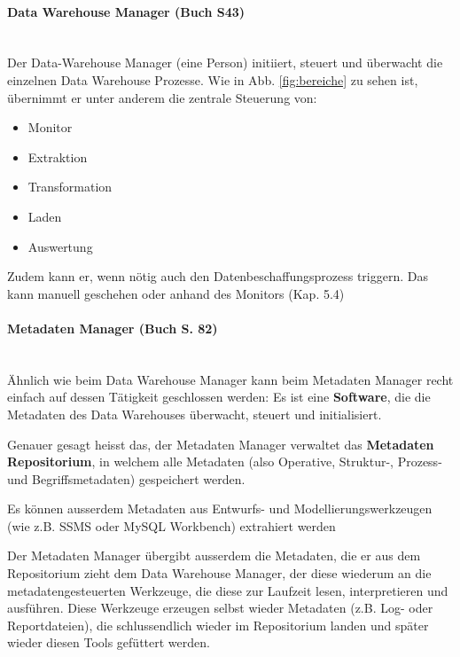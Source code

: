 \documentclass[a4paper, 11pt, nofootinbib]{article}
\begin{document}
\paragraph{Data Warehouse Manager (Buch S43)}\mbox{}\\
Der Data-Warehouse Manager (eine Person) initiiert, steuert und überwacht die einzelnen Data Warehouse Prozesse. Wie in Abb. \ref{fig:bereiche} zu sehen ist, übernimmt er unter anderem die zentrale Steuerung von: 

\begin{itemize}
	\item Monitor
	\item Extraktion
	\item Transformation
	\item Laden
	\item Auswertung
\end{itemize}

Zudem kann er, wenn nötig auch den Datenbeschaffungsprozess triggern. Das kann manuell geschehen oder anhand des Monitors (Kap. 5.4)

\paragraph{Metadaten Manager (Buch S. 82)}\mbox{}\\
Ähnlich wie beim Data Warehouse Manager kann beim Metadaten Manager recht einfach auf dessen Tätigkeit geschlossen werden: Es ist eine \textbf{Software}, die die Metadaten des Data Warehouses überwacht, steuert und initialisiert.

\vspace{10px}

\noindent Genauer gesagt heisst das, der Metadaten Manager verwaltet das \textbf{Metadaten Repositorium}, in welchem alle Metadaten (also Operative, Struktur-, Prozess- und Begriffsmetadaten) gespeichert werden.

Es können ausserdem Metadaten aus Entwurfs- und Modellierungswerkzeugen (wie z.B. SSMS oder MySQL Workbench) extrahiert werden

\vspace{10px}

\noindent Der Metadaten Manager übergibt ausserdem die Metadaten, die er aus dem Repositorium zieht dem Data Warehouse Manager, der diese wiederum an die metadatengesteuerten Werkzeuge, die diese zur Laufzeit lesen, interpretieren und ausführen. Diese Werkzeuge erzeugen selbst wieder Metadaten (z.B. Log- oder Reportdateien), die schlussendlich wieder im Repositorium landen und später wieder diesen Tools gefüttert werden. 
\end{document}
